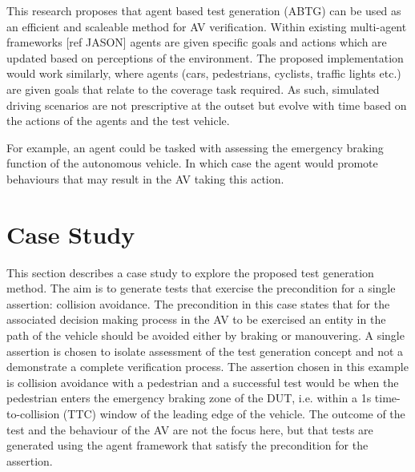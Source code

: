 \documentclass[letterpaper, 10 pt, journal, twoside]{IEEEtran}
\begin{document}
This research proposes that agent based test generation (ABTG) can be used as an efficient and scaleable method for AV verification. Within existing multi-agent frameworks [ref JASON] agents are given specific goals and actions which are updated based on perceptions of the environment. The proposed implementation would work similarly, where agents (cars, pedestrians, cyclists, traffic lights etc.) are given goals that relate to the coverage task required. As such, simulated driving  scenarios are not prescriptive at the outset but evolve with time based on the actions of the agents and the test vehicle.

For example, an agent could be tasked with assessing the emergency braking function of the autonomous vehicle. In which case the agent would promote behaviours that may result in the AV taking this action. %


%
%



\section{Case Study}
 
This section describes a case study to explore the proposed test generation method. The aim is to generate tests that exercise the precondition for a single assertion: collision avoidance. The precondition in this case states that for the associated decision making process in the AV to be exercised an entity in the path of the vehicle should be avoided either by braking or manouvering.  A single assertion is chosen to isolate assessment of the test generation concept and not a demonstrate a complete verification process. The assertion chosen in this example is collision avoidance with a pedestrian and a successful test would be when the pedestrian enters the emergency braking zone of the DUT, i.e. within a 1s time-to-collision (TTC) window of the leading edge of the vehicle. The outcome of the test and the behaviour of the AV are not the focus here, but that tests are generated using the agent framework that satisfy the precondition for the assertion. 
\end{document}
